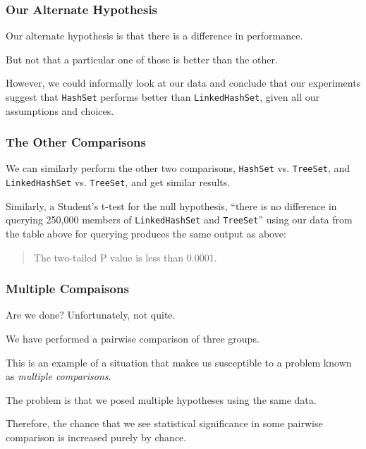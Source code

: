 \begin{frame}
\frametitle{Our Alternate Hypothesis}
\begin{changemargin}{1cm}

Our alternate hypothesis is that there
is a difference in performance. 

But not that a particular one
of those is better than the other. 

However, we could informally
look at our data and conclude that our experiments suggest that
\texttt{HashSet} performs better than \texttt{LinkedHashSet}, given all our
assumptions and choices.

\end{changemargin}
\end{frame}

\begin{frame}
\frametitle{}
\begin{changemargin}{1cm}


\end{changemargin}
\end{frame}

\begin{frame}
\frametitle{The Other Comparisons}
\begin{changemargin}{1cm}

We can similarly perform the other two comparisons,
\texttt{HashSet} vs. \texttt{TreeSet}, and \texttt{LinkedHashSet}
 vs. \texttt{TreeSet}, and get
similar results.

Similarly, a Student's t-test for the
null hypothesis, ``there is no difference in querying 250,000
members of \texttt{LinkedHashSet} and \texttt{TreeSet}'' using our data from
the table above for querying produces the same output as above:
\begin{quote}
    The two-tailed P value is less than $0.0001$.
\end{quote}

\end{changemargin}
\end{frame}


\begin{frame}
\frametitle{Multiple Compaisons}
\begin{changemargin}{1cm}

Are we done? Unfortunately, not quite. 

We have performed a pairwise comparison of three groups. 

This is an example of a situation that makes
us susceptible to a problem known as \emph{multiple comparisons}.

The problem is that we posed multiple hypotheses using the same
data.

Therefore, the chance that we see statistical significance
in some pairwise comparison is increased purely by chance.

\end{changemargin}
\end{frame}


